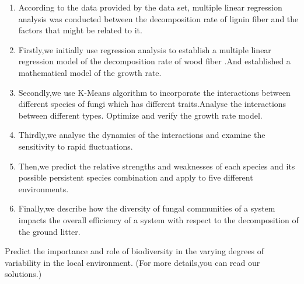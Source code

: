 \documentclass[12pt]{article}
\begin{document}
\begin{enumerate}[\bfseries 1.]

	\item According to the data provided by the data set, multiple linear regression analysis was conducted between the decomposition rate of lignin fiber and the factors that might be related to it. \par 
	
	\item Firstly,we initially use regression analysis to establish a multiple linear regression model of the decomposition rate of wood fiber .And established a mathematical model of the growth rate.\par 

	\item Secondly,we use K-Means algorithm to incorporate the interactions between different species of fungi which has different traits.Analyse the interactions between different types. Optimize and verify the growth rate model.\par 

	\item Thirdly,we analyse the dynamics of the interactions and examine the sensitivity to rapid fluctuations.\par 

	\item Then,we predict the relative strengths and weaknesses of each species and its possible persistent species combination and apply to five different environments.\par

	\item Finally,we describe how the diversity of fungal communities of a system impacts the overall efficiency of a system with respect to the decomposition of the ground litter.\par 

\end{enumerate}\par



Predict the importance and role of biodiversity in the varying degrees of variability in the local environment.
(For more details,you can read our solutions.)\par 
\end{document}
